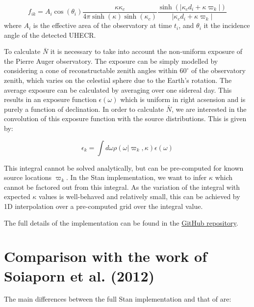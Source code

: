 \documentclass[fontsize=12pt]{article}
\begin{document}
\begin{equation}
f_{ik} = A_i \cos(\theta_i) \frac{\kappa \kappa_c}{4 \pi \sinh(\kappa) \sinh(\kappa_c)} \frac{\sinh(|\kappa_c d_i + \kappa \varpi_k |)}{|\kappa_c d_i + \kappa \varpi_k |}
\end{equation}
where $A_i$ is the effective area of the observatory at time $t_i$, and $\theta_i$ it the incidence angle of the detected UHECR. 

To calculate $\bar{N}$ it is necessary to take into account the non-uniform exposure of the Pierre Auger observatory. The exposure can be simply modelled by considering a cone of reconstructable zenith angles within $60^{\circ}$ of the observatory zenith, which varies on the celestial sphere due to the Earth's rotation. The average exposure can be calculated by averaging over one sidereal day. This results in an exposure function $\epsilon(\omega)$ which is uniform in right acsension and is purely a function of declination. In order to calculate $\bar{N}$, we are interested in the convolution of this exposure function with the source distributions. This is given by:

\begin{equation}
\epsilon_k  = \int d \omega \rho(\omega | \varpi_k, \kappa) \epsilon(\omega)
\end{equation}

This integral cannot be solved analytically, but can be pre-computed for known source locations $\varpi_k$. In the Stan implementation, we want to infer $\kappa$ which cannot be factored out from this integral. As the variation of the integral with expected $\kappa$ values is well-behaved and relatively small, this can be achieved by 1D interpolation over a pre-computed grid over the integral value. 

The full details of the implementation can be found in the \href{https://github.com/cescalara/uhecr_model}{GitHub repository}.

\section{Comparison with the work of Soiaporn et al. (2012)}

The main differences between the full Stan implementation and that of \cite{soiaporn} are:
\end{document}
